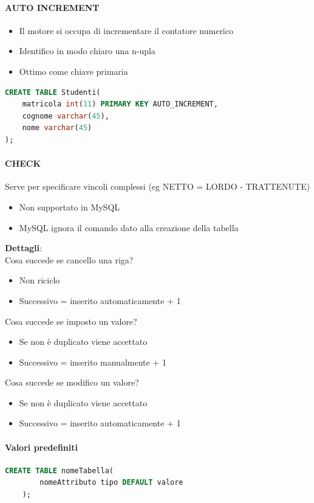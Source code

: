 \documentclass[12pt,a4paper]{article}
\begin{document}
\paragraph{AUTO INCREMENT}
\begin{itemize}
\item Il motore si occupa di incrementare il contatore numerico
\item Identifico in modo chiaro una n-upla
\item Ottimo come chiave primaria
\end{itemize}
\begin{lstlisting}[language = SQL]
CREATE TABLE Studenti(
	matricola int(11) PRIMARY KEY AUTO_INCREMENT,
	cognome varchar(45),
	nome varchar(45)
);
\end{lstlisting}

\paragraph{CHECK\\}
Serve per specificare vincoli complessi (eg NETTO = LORDO - TRATTENUTE)
\begin{itemize}
\item Non supportato in MySQL
\item MySQL ignora il comando dato alla creazione della tabella
\end{itemize}
\textbf{Dettagli}:\\
Cosa succede se cancello una riga?
\begin{itemize}
\item Non riciclo
\item Successivo = inserito automaticamente + 1
\end{itemize}
Cosa succede se imposto un valore?
\begin{itemize}
\item Se non è duplicato viene accettato
\item Successivo = inserito manualmente + 1
\end{itemize}
Cosa succede se modifico un valore?
\begin{itemize}
\item Se non è duplicato viene accettato
\item Successivo = inserito automaticamente + 1
\end{itemize}

\paragraph{Valori predefiniti}
\flushleft
\begin{lstlisting}[language = SQL]
CREATE TABLE nomeTabella(
        nomeAttributo tipo DEFAULT valore
    );
\end{lstlisting}
\end{document}
